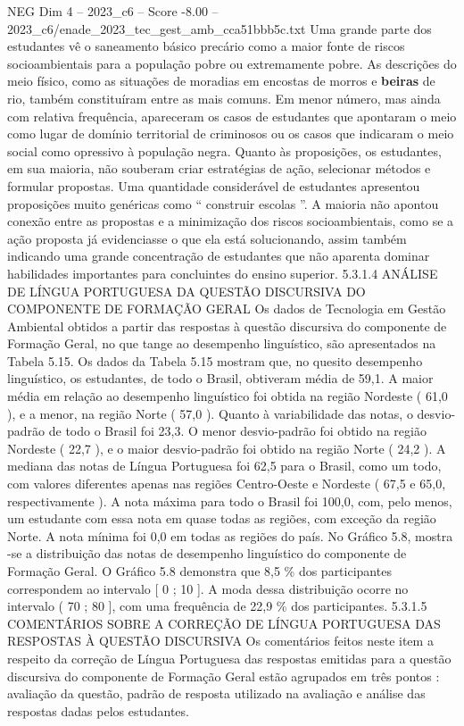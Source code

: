 \begin{textsample}{NEG Dim 4 – 2023\_c6 – Score -8.00 – 2023\_c6/enade\_2023\_tec\_gest\_amb\_cca51bbb5c.txt}
Uma grande parte dos estudantes vê o saneamento básico precário como a maior fonte de riscos socioambientais para a população pobre ou extremamente pobre.
As descrições do meio físico, como as situações de moradias em encostas de morros e \textbf{beiras} de rio, também constituíram entre as mais comuns.
Em menor número, mas ainda com relativa frequência, apareceram os casos de estudantes que apontaram o meio como lugar de domínio territorial de criminosos ou os casos que indicaram o meio social como opressivo à população negra.
Quanto às proposições, os estudantes, em sua maioria, não souberam criar estratégias de ação, selecionar métodos e formular propostas.
Uma quantidade considerável de estudantes apresentou proposições muito genéricas como “ construir escolas ”.
A maioria não apontou conexão entre as propostas e a minimização dos riscos socioambientais, como se a ação proposta já evidenciasse o que ela está solucionando, assim também indicando uma grande concentração de estudantes que não aparenta dominar habilidades importantes para concluintes do ensino superior. 5.3.1.4 ANÁLISE DE LÍNGUA PORTUGUESA DA QUESTÃO DISCURSIVA DO COMPONENTE DE FORMAÇÃO GERAL Os dados de Tecnologia em Gestão Ambiental obtidos a partir das respostas à questão discursiva do componente de Formação Geral, no que tange ao desempenho linguístico, são apresentados na Tabela 5.15.
Os dados da Tabela 5.15 mostram que, no quesito desempenho linguístico, os estudantes, de todo o Brasil, obtiveram média de 59,1.
A maior média em relação ao desempenho linguístico foi obtida na região Nordeste ( 61,0 ), e a menor, na região Norte ( 57,0 ).
Quanto à variabilidade das notas, o desvio-padrão de todo o Brasil foi 23,3.
O menor desvio-padrão foi obtido na região Nordeste ( 22,7 ), e o maior desvio-padrão foi obtido na região Norte ( 24,2 ).
A mediana das notas de Língua Portuguesa foi 62,5 para o Brasil, como um todo, com valores diferentes apenas nas regiões Centro-Oeste e Nordeste ( 67,5 e 65,0, respectivamente ).
A nota máxima para todo o Brasil foi 100,0, com, pelo menos, um estudante com essa nota em quase todas as regiões, com exceção da região Norte.
A nota mínima foi 0,0 em todas as regiões do país.
No Gráfico 5.8, mostra -se a distribuição das notas de desempenho linguístico do componente de Formação Geral.
O Gráfico 5.8 demonstra que 8,5 \% dos participantes correspondem ao intervalo [ 0 ; 10 ].
A moda dessa distribuição ocorre no intervalo ( 70 ; 80 ], com uma frequência de 22,9 \% dos participantes. 5.3.1.5 COMENTÁRIOS SOBRE A CORREÇÃO DE LÍNGUA PORTUGUESA DAS RESPOSTAS À QUESTÃO DISCURSIVA Os comentários feitos neste item a respeito da correção de Língua Portuguesa das respostas emitidas para a questão discursiva do componente de Formação Geral estão agrupados em três pontos : avaliação da questão, padrão de resposta utilizado na avaliação e análise das respostas dadas pelos estudantes.

\end{textsample}
